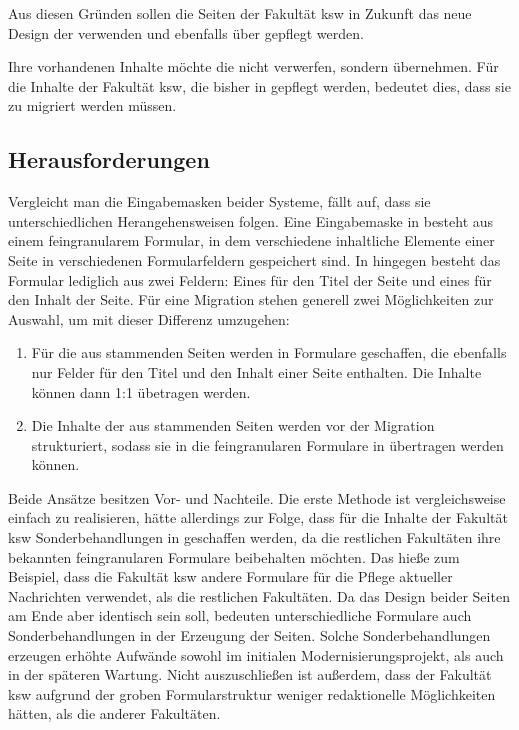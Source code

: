             Aus diesen Gründen sollen die Seiten der Fakultät \gls{ksw}
            in Zukunft das neue Design der \fernUni verwenden und ebenfalls
            über \imperia gepflegt werden.

            Ihre vorhandenen Inhalte möchte die \fernUni nicht verwerfen, sondern übernehmen.
            Für die Inhalte der Fakultät \gls{ksw}, die bisher in \wordpress gepflegt werden,
            bedeutet dies, dass sie zu \imperia migriert werden müssen.

        \subsection{Herausforderungen}
            Vergleicht man die Eingabemasken beider Systeme, fällt auf,
            dass sie unterschiedlichen Herangehensweisen folgen.
            Eine Eingabemaske in \imperia besteht aus einem feingranularem Formular,
            in dem verschiedene inhaltliche Elemente einer Seite in verschiedenen Formularfeldern
            gespeichert sind.
            In \wordpress hingegen besteht das Formular lediglich aus zwei Feldern:
            Eines für den Titel der Seite und eines für den Inhalt der Seite.
            Für eine Migration stehen generell zwei Möglichkeiten zur Auswahl,
            um mit dieser Differenz umzugehen:

            \begin{enumerate}
                \item   Für die aus \wordpress stammenden Seiten werden in \imperia Formulare geschaffen,
                        die ebenfalls nur Felder für den Titel und den Inhalt einer Seite enthalten.
                        Die Inhalte können dann 1:1 übetragen werden.
                \item   Die Inhalte der aus \wordpress stammenden Seiten werden vor der Migration strukturiert,
                        sodass sie in die feingranularen Formulare in \imperia übertragen werden können.
            \end{enumerate}

            Beide Ansätze besitzen Vor- und Nachteile.
            Die erste Methode ist vergleichsweise einfach zu realisieren,
            hätte allerdings zur Folge, dass für die Inhalte der Fakultät \gls{ksw} Sonderbehandlungen
            in \imperia geschaffen werden, da die restlichen Fakultäten ihre bekannten feingranularen
            Formulare beibehalten möchten.
            Das hieße zum Beispiel, dass die Fakultät \gls{ksw} andere Formulare für die Pflege aktueller
            Nachrichten verwendet, als die restlichen Fakultäten.
            Da das Design beider Seiten am Ende aber identisch sein soll, bedeuten unterschiedliche Formulare
            auch Sonderbehandlungen in der Erzeugung der Seiten.
            Solche Sonderbehandlungen erzeugen erhöhte Aufwände sowohl im initialen Modernisierungsprojekt,
            als auch in der späteren Wartung.
            Nicht auszuschließen ist außerdem, dass \editors der Fakultät \gls{ksw} aufgrund der groben Formularstruktur
            weniger redaktionelle Möglichkeiten hätten, als die anderer Fakultäten.

